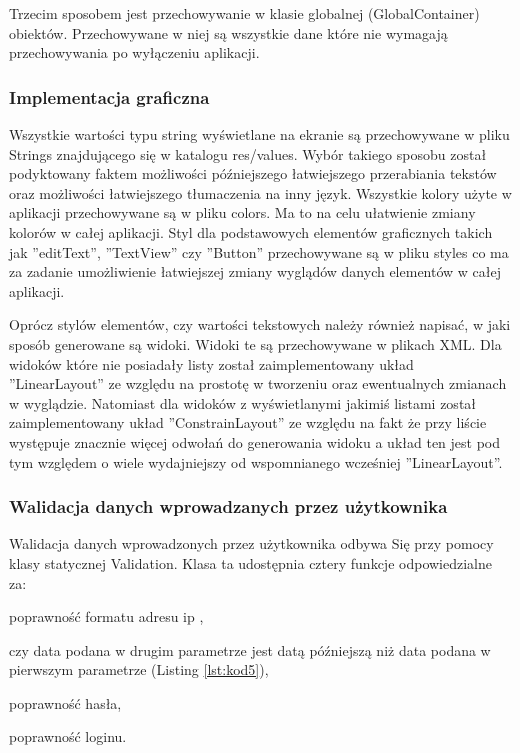 	Trzecim sposobem jest przechowywanie w klasie globalnej (GlobalContainer)  obiektów. Przechowywane w niej są wszystkie dane które nie wymagają przechowywania po wyłączeniu aplikacji.
		
	\subsubsection{Implementacja graficzna}
		
	Wszystkie wartości typu string wyświetlane na ekranie są przechowywane w pliku Strings znajdującego się w katalogu res/values. Wybór takiego sposobu został podyktowany faktem możliwości późniejszego łatwiejszego przerabiania tekstów oraz możliwości łatwiejszego tłumaczenia na inny język. Wszystkie kolory użyte w aplikacji przechowywane są w pliku colors. Ma to na celu ułatwienie  zmiany kolorów w całej aplikacji. Styl dla podstawowych elementów graficznych takich jak ''editText'', ''TextView'' czy ''Button'' przechowywane są w pliku styles co ma za zadanie umożliwienie łatwiejszej zmiany wyglądów danych elementów w całej aplikacji.
		
	Oprócz stylów elementów, czy wartości tekstowych należy również napisać, w jaki sposób generowane są widoki. Widoki te są przechowywane w plikach XML.  Dla widoków które nie posiadały listy został zaimplementowany układ ''LinearLayout'' ze względu na prostotę w tworzeniu oraz ewentualnych zmianach w wyglądzie. Natomiast dla widoków z wyświetlanymi jakimiś listami został zaimplementowany układ ''ConstrainLayout'' ze względu na fakt że przy liście występuje znacznie więcej odwołań do generowania widoku a układ ten jest pod tym względem o wiele wydajniejszy od wspomnianego wcześniej ''LinearLayout''. 
		
	\newpage
	\subsubsection{Walidacja danych wprowadzanych przez użytkownika}
	Walidacja danych wprowadzonych przez użytkownika odbywa Się przy pomocy klasy statycznej Validation. Klasa ta udostępnia cztery funkcje odpowiedzialne za:
	\begin{itemize*}
	\item poprawność formatu adresu ip ,
	\item czy data podana w drugim parametrze jest datą późniejszą niż data podana w pierwszym parametrze (Listing \ref{lst:kod5}),
	\item poprawność hasła,
	\item poprawność loginu.
	\end{itemize*}

